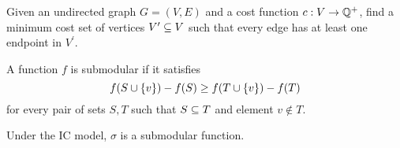 \begin{problem}
    Given an undirected graph $G = (V, E)$ and a cost function $c: V \rightarrow \mathbb{Q}^+$, find a minimum cost 
    set of vertices $V^\prime \subseteq V$ such that every edge has at least one endpoint in $V^\prime$. 
    \label{prob:vertex_cover}
\end{problem}

\begin{definition}[Submodularity]
    A function $f$ is submodular if it satisfies
    \begin{equation*}
        f \! \left( S \cup \left\{ v \right\} \right) - f \! \left( S \right) \geq f \! \left( T \cup \left\{ v \right\} \right) - f \! \left( T \right)
    \end{equation*}
    for every pair of sets $S, T$ such that $S \subseteq T$ and element $v \notin T$.
    \label{def:submod}
\end{definition}

\begin{theorem}
    Under the IC model, $\sigma$ is a submodular function. 
    \label{thm:}
\end{theorem}
